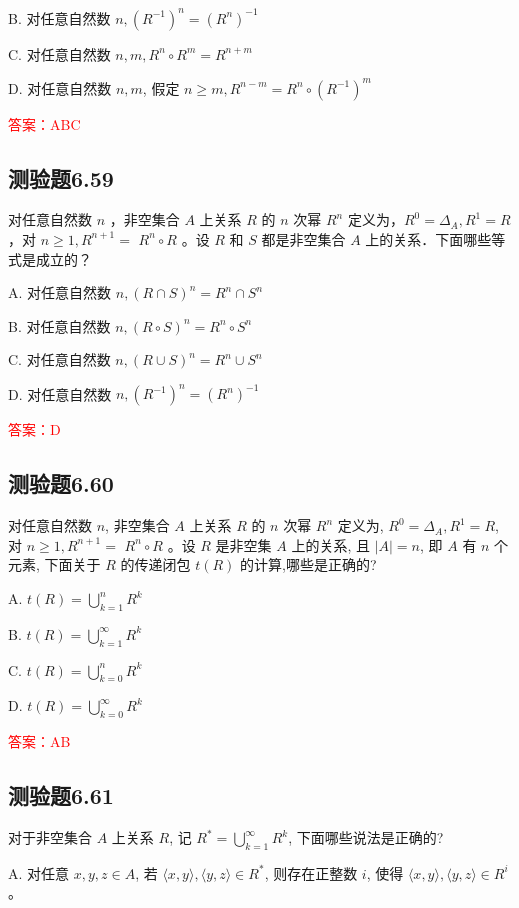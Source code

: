 \documentclass[UTF8, heading=true]{ctexart}
\begin{document}
B. 对任意自然数 $n,\left(R^{-1}\right)^n=\left(R^n\right)^{-1}$

C. 对任意自然数 $n, m, R^n \circ R^m=R^{n+m}$

D. 对任意自然数 $n, m$, 假定 $n \geq m, R^{n-m}=R^n \circ\left(R^{-1}\right)^m$

\textcolor{red}{答案：ABC}

\subsection{测验题6.59}

对任意自然数 $n$ ，非空集合 $A$ 上关系 $R$ 的 $n$ 次幂 $R^n$ 定义为，$R^0=\Delta_A, R^1=R$ ，对 $n \geq 1, R^{n+1}=$
$R^n \circ R$ 。设 $R$ 和 $S$ 都是非空集合 $A$ 上的关系．下面哪些等式是成立的？

A. 对任意自然数 $n,(R \cap S)^n=R^n \cap S^n$

B. 对任意自然数 $n,(R \circ S)^n=R^n \circ S^n$


C. 对任意自然数 $n,(R \cup S)^n=R^n \cup S^n$

D. 对任意自然数 $n,\left(R^{-1}\right)^n=\left(R^n\right)^{-1}$

\textcolor{red}{答案：D}

\subsection{测验题6.60}

对任意自然数 $n$, 非空集合 $A$ 上关系 $R$ 的 $n$ 次幂 $R^n$ 定义为, $R^0=\Delta_A, R^1=R$, 对 $n \geq 1, R^{n+1}=$ $R^n \circ R$ 。设 $R$ 是非空集 $A$ 上的关系, 且 $|A|=n$, 即 $A$ 有 $n$ 个元素, 下面关于 $R$ 的传递闭包 $t(R)$ 的计算,哪些是正确的?

A. $t(R)=\bigcup_{k=1}^n R^k$

B. $t(R)=\bigcup_{k=1}^{\infty} R^k$

C. $t(R)=\bigcup_{k=0}^n R^k$

D. $t(R)=\bigcup_{k=0}^{\infty} R^k$

\textcolor{red}{答案：AB}

\subsection{测验题6.61}
对于非空集合 $A$ 上关系 $R$, 记 $R^*=\bigcup_{k=1}^{\infty} R^k$, 下面哪些说法是正确的?

A. 对任意 $x, y, z \in A$, 若 $\langle x, y\rangle,\langle y, z\rangle \in R^*$, 则存在正整数 $i$, 使得 $\langle x, y\rangle,\langle y, z\rangle \in R^i$ 。
\end{document}
